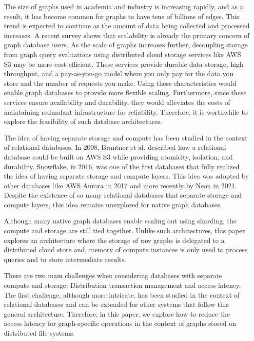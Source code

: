 The size of graphs used in academia and industry is increasing rapidly, and as a result, 
it has become common for graphs to have tens of
billions of edges\cite{sahu2017ubiquity}. This trend is expected to
continue as the amount of data being collected and processed increases. A recent
survey shows that scalability is already the primary concern of graph database
users\cite{sahu2017ubiquity}. As the scale of graphs
increases further, decoupling storage from graph query evaluations using distributed
cloud storage services like AWS S3\cite{awsS3} may be
more cost-efficient. These services provide durable data storage, high
throughput, and a pay-as-you-go model where you only pay for the data you store
and the number of requests you make. Using these characteristics would
enable graph databases to provide more flexible scaling. Furthermore, since
these services ensure availability and durability, they would alleviates 
the costs of maintaining redundant infrastructure for reliability. 
Therefore, it is worthwhile to explore the feasibility of such database architectures.

\medskip
The idea of having separate storage and compute has been studied in the context
of relational databases. In 2008, Brantner et al.\cite{brantner2008building}
described how a relational database could be built on AWS S3 while 
providing atomicity, isolation, and durability.
Snowflake\cite{dageville2016snowflake}, in 2016, was
one of the first databases that fully realized the idea of having
separate storage and compute layers. This idea was adopted by other databases
like AWS Aurora\cite{verbitski2017amazon} in 2017 and more recently by
Neon\cite{neonPostgres} in 2021. Despite the existence of so many relational databases
that separate storage and compute layers, this idea remains unexplored for
native graph databases.

\medskip
Although many native graph databases enable scaling out
using sharding\cite{besta2023demystifying}, the compute and storage are
still tied together. Unlike such architectures, this paper explores an
architecture where the storage of raw graphs is delegated to a distributed cloud
store and, memory of compute instances is only used to process queries and to store
intermediate results.

\medskip
There are two main challenges when considering databases with separate compute
and storage: Distribution transaction management and access latency. The first
challenge, although more intricate, has been studied in the context of
relational databases\cite{brantner2008building} and can be extended for other
systems that follow this general architecture. Therefore, in this paper, we
explore how to reduce the access latency for graph-specific operations in
the context of graphs stored on distributed file systems.

